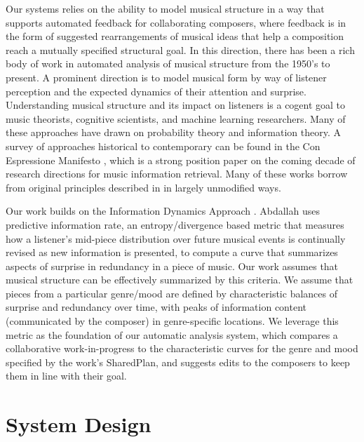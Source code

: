 \documentclass[final,authoryear,5p,times,twocolumn]{elsarticle}
\begin{document}
Our systems relies on the ability to model musical structure in a way that supports automated feedback for collaborating composers, where feedback is in the form of suggested rearrangements of musical ideas that help a composition reach a mutually specified structural goal. In this direction, there has been a rich body of work in automated analysis of musical structure from the 1950's to present. A prominent direction is to model musical form by way of listener perception and the expected dynamics of their attention and surprise. Understanding musical structure and its impact on listeners is a cogent goal to music theorists, cognitive scientists, and machine learning researchers. Many of these approaches have drawn on probability theory and information theory. A survey of approaches historical to contemporary can be found in the Con Espressione Manifesto \citep{widmer2016getting}, which is a strong position paper on the coming decade of research directions for music information retrieval. Many of these works borrow from original principles described in \cite{shannon} in largely unmodified ways.

Our work builds on the Information Dynamics Approach \citep{abdallah2012cognitive}. Abdallah uses predictive information rate, an entropy/divergence based metric that measures how a listener's mid-piece distribution over future musical events is continually revised as new information is presented, to compute a curve that summarizes aspects of surprise in redundancy in a piece of music. Our work assumes that musical structure can be effectively summarized by this criteria. We assume that pieces from a particular genre/mood are defined by characteristic balances of surprise and redundancy over time, with peaks of information content (communicated by the composer) in genre-specific locations. We leverage this metric as the foundation of our automatic analysis system, which compares a collaborative work-in-progress to the characteristic curves for the genre and mood specified by the work's SharedPlan, and suggests edits to the composers to keep them in line with their goal.

\section{System Design}
\end{document}
